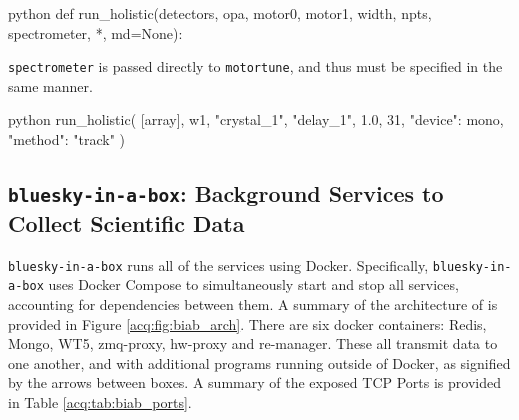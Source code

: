 \begin{codefragment}{python}
def run_holistic(detectors, opa, motor0, motor1, width, npts, spectrometer, *, md=None):
\end{codefragment}

\texttt{spectrometer} is passed directly to \texttt{motortune}, and thus must be specified in the same manner.

\begin{codefragment}{python}
run_holistic(
    [array],
    w1,
    "crystal_1",
    "delay_1",
    1.0,
    31,
    {"device": mono, "method": "track"}
)
\end{codefragment}


\subsection{\texttt{bluesky-in-a-box}: Background Services to Collect Scientific Data}

\texttt{bluesky-in-a-box} runs all of the services using Docker\cite{merkel2014docker}\cite{dockerdocs}.
Specifically, \texttt{bluesky-in-a-box} uses Docker Compose\cite{dockercompose} to simultaneously start and stop all services, accounting for dependencies between them.
A summary of the architecture of \biab{} is provided in Figure \ref{acq:fig:biab_arch}.
There are six docker containers: Redis, Mongo, WT5, zmq-proxy, hw-proxy and re-manager.
These all transmit data to one another, and with additional programs running outside of Docker, as signified by the arrows between boxes.
A summary of the exposed TCP Ports is provided in Table \ref{acq:tab:biab_ports}.

